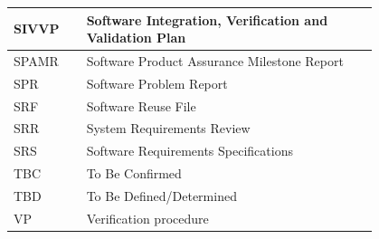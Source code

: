 \begin{xltabular}{\textwidth}{|l|>{\raggedright\arraybackslash}p{0.8\linewidth}|}
    SIVVP & Software Integration, Verification and Validation Plan \\ \hline
    SPAMR & Software Product Assurance Milestone Report \\ \hline
    SPR & Software Problem Report \\ \hline
    SRF & Software Reuse File \\ \hline
    SRR & System Requirements Review \\ \hline
    SRS & Software Requirements Specifications \\ \hline
    TBC & To Be Confirmed \\ \hline
    TBD & To Be Defined/Determined \\ \hline
    VP & Verification procedure \\ \hline
\end{xltabular}